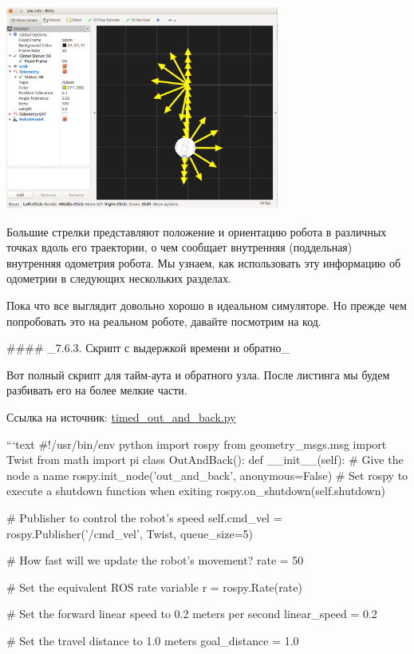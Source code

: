 \includegraphics[width=9cm]{.gitbook/assets/snimok-ekrana-2020-05-30-v-14.08.50.png}

Большие стрелки представляют положение и ориентацию робота в различных точках вдоль его траектории, о чем сообщает внутренняя (поддельная) внутренняя одометрия робота. Мы узнаем, как использовать эту информацию об одометрии в следующих нескольких разделах.

Пока что все выглядит довольно хорошо в идеальном симуляторе. Но прежде чем попробовать это на реальном роботе, давайте посмотрим на код.

#### _7.6.3. Скрипт с выдержкой времени и обратно_

Вот полный скрипт для тайм-аута и обратного узла. После листинга мы будем разбивать его на более мелкие части.

Ссылка на источник: \href{https://github.com/pirobot/rbx1/blob/indigo-devel/rbx1_nav/nodes/timed_out_and_back.py}{timed\_out\_and\_back.py}

```text
#!/usr/bin/env python
import rospy
from geometry_msgs.msg import Twist from math import pi
class OutAndBack(): def __init__(self):
        # Give the node a name
rospy.init_node('out_and_back', anonymous=False)
# Set rospy to execute a shutdown function when exiting
 rospy.on_shutdown(self.shutdown)
 
 # Publisher to control the robot's speed
 self.cmd_vel = rospy.Publisher('/cmd_vel', Twist, queue_size=5)

 # How fast will we update the robot's movement?
 rate = 50

 # Set the equivalent ROS rate variable
 r = rospy.Rate(rate)

 # Set the forward linear speed to 0.2 meters per second
 linear_speed = 0.2

 # Set the travel distance to 1.0 meters
 goal_distance = 1.0

